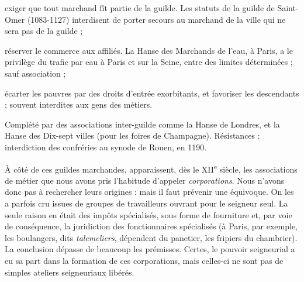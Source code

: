 \documentclass[french,twoside]{book} %
\begin{document}
\begin{listalpha}[itemsep=0pt,]
\item[] \hspace{-1.5em}{\bfseries D’où les tendances :}
\item exiger que tout marchand fît partie de la guilde. Les statuts de la guilde de Saint-Omer (1083-1127) interdisent de porter secours au marchand de la ville qui ne sera pas de la guilde ;
\item réserver le commerce aux affiliés. La Hanse des Marchands de l’eau, à Paris, a le privilège du trafic par eau à Paris et sur la Seine, entre des limites déterminées ; sauf association ;
\item écarter les pauvres par des droits d’entrée exorbitants, et favoriser les descendants ; souvent interdites aux gens des métiers.

\end{listalpha}\noindent Complété par des associations inter-guilde comme la Hanse de Londres, et la Hanse des Dix-sept villes (pour les foires de Champagne). Résistances : interdiction des confréries au synode de Rouen, en 1190.\par
À côté de ces guildes marchandes, apparaissent, dès le XII\textsuperscript{e} siècle, les associations de métier que nous avons pris l’habitude d’appeler \emph{corporations}. Nous n’avons donc pas à rechercher leurs origines : mais il faut prévenir une équivoque. On les a parfois cru issues de groupes de travailleurs ouvrant pour le seigneur seul. La seule raison en était des impôts spécialisés, sous forme de fourniture et, par voie de conséquence, la juridiction des fonctionnaires spécialisés (à Paris, par exemple, les boulangers, dits \emph{talemeliers}, dépendent du panetier, les fripiers du chambrier). La conclusion dépasse de beaucoup les prémisses. Certes, le pouvoir seigneurial a eu sa part dans la formation de ces corporations, mais celles-ci ne sont pas de simples ateliers seigneuriaux libérés.\par
\end{document}
